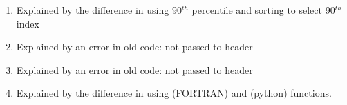 \begin{landscape}
{\begin{tabular}{lllllllr}
& & & & & \\

\hline
\hline
\end{tabular}
}
\begin{enumerate}
\item Explained by the difference in using 90$^{th}$ percentile and sorting to select 90$^{th}$ index
\item Explained by an error in old code:  not passed to header
\item Explained by an error in old code:  not passed to header
\item Explained by the difference in using  (FORTRAN) and  (python) functions.
\end{enumerate}
\end{landscape}


